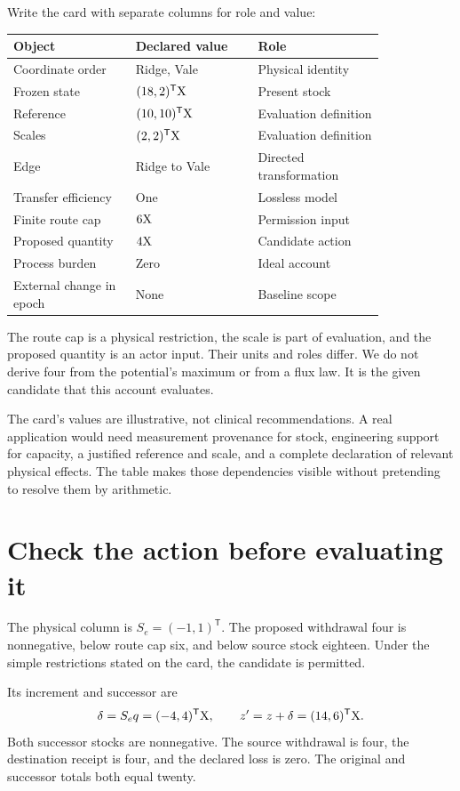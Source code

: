 Write the card with separate columns for role and value:
\begin{center}
\begin{tabular}{P{0.27\linewidth}P{0.27\linewidth}P{0.29\linewidth}}
\toprule
Object & Declared value & Role\\
\midrule
Coordinate order & Ridge, Vale & Physical identity\\
Frozen state & \((18,2)^{\mathsf T}\mathrm{X}\) & Present stock\\
Reference & \((10,10)^{\mathsf T}\mathrm{X}\) & Evaluation definition\\
Scales & \((2,2)^{\mathsf T}\mathrm{X}\) & Evaluation definition\\
Edge & Ridge to Vale & Directed transformation\\
Transfer efficiency & One & Lossless model\\
Finite route cap & \(6\mathrm{X}\) & Permission input\\
Proposed quantity & \(4\mathrm{X}\) & Candidate action\\
Process burden & Zero & Ideal account\\
External change in epoch & None & Baseline scope\\
\bottomrule
\end{tabular}
\end{center}
The route cap is a physical restriction, the scale is part of evaluation, and the proposed quantity is an actor input. Their units and roles differ. We do not derive four from the potential's maximum or from a flux law. It is the given candidate that this account evaluates.

The card's values are illustrative, not clinical recommendations. A real application would need measurement provenance for stock, engineering support for capacity, a justified reference and scale, and a complete declaration of relevant physical effects. The table makes those dependencies visible without pretending to resolve them by arithmetic.

\section{Check the action before evaluating it}

The physical column is \(S_e=(-1,1)^{\mathsf T}\). The proposed withdrawal four is nonnegative, below route cap six, and below source stock eighteen. Under the simple restrictions stated on the card, the candidate is permitted.

Its increment and successor are
\begin{equation}
\delta=S_eq=(-4,4)^{\mathsf T}\mathrm{X},
\qquad z'=z+\delta=(14,6)^{\mathsf T}\mathrm{X}.
\end{equation}
Both successor stocks are nonnegative. The source withdrawal is four, the destination receipt is four, and the declared loss is zero. The original and successor totals both equal twenty.

